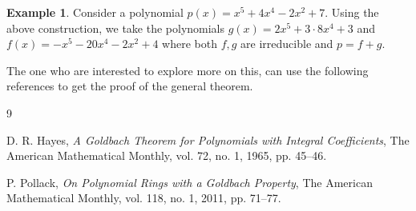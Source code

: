 \documentclass[11pt]{article}
\theoremstyle{definition} %
\newtheorem{example}{Example}[section]
\begin{document}
\begin{example}
    Consider a polynomial $p(x)=x^5+4x^4-2x^2+7$. Using the above construction, we take the polynomials $g(x)=2x^5+3\cdot 8x^4+3$ and $f(x)=-x^5-20x^4-2x^2+4$ where both $f,g$ are
    irreducible and $p=f+g$.
\end{example}

The one who are interested to explore more on this, can use the following references to get the proof of the general theorem.

\begin{thebibliography}{9} %

D. R. Hayes, \textit{A Goldbach Theorem for Polynomials with Integral Coefficients}, 
The American Mathematical Monthly, vol. 72, no. 1, 1965, pp. 45--46.

P. Pollack, \textit{On Polynomial Rings with a Goldbach Property}, 
The American Mathematical Monthly, vol. 118, no. 1, 2011, pp. 71--77.

\end{thebibliography}
\end{document}
